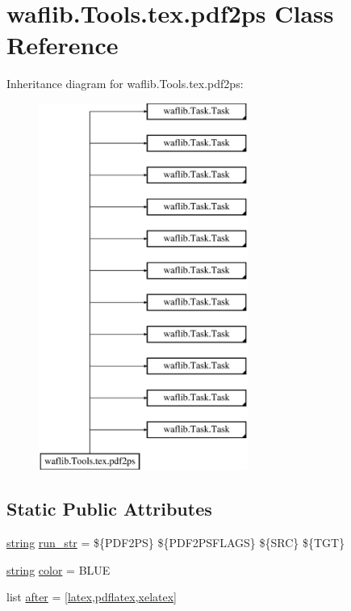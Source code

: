 \hypertarget{classwaflib_1_1_tools_1_1tex_1_1pdf2ps}{}\section{waflib.\+Tools.\+tex.\+pdf2ps Class Reference}
\label{classwaflib_1_1_tools_1_1tex_1_1pdf2ps}
Inheritance diagram for waflib.\+Tools.\+tex.\+pdf2ps\+:\begin{figure}[H]
\begin{center}
\leavevmode
\includegraphics[height=12.000000cm]{classwaflib_1_1_tools_1_1tex_1_1pdf2ps}
\end{center}
\end{figure}
\subsection*{Static Public Attributes}
\begin{DoxyCompactItemize}
\item 
\hyperlink{test__lib_f_l_a_c_2format_8c_ab02026ad0de9fb6c1b4233deb0a00c75}{string} \hyperlink{classwaflib_1_1_tools_1_1tex_1_1pdf2ps_ac4694d84ae08bec5367c7c83c8aa2a33}{run\+\_\+str} = \textquotesingle{}\$\{P\+D\+F2\+PS\} \$\{P\+D\+F2\+P\+S\+F\+L\+A\+GS\} \$\{S\+RC\} \$\{T\+GT\}\textquotesingle{}
\item 
\hyperlink{test__lib_f_l_a_c_2format_8c_ab02026ad0de9fb6c1b4233deb0a00c75}{string} \hyperlink{classwaflib_1_1_tools_1_1tex_1_1pdf2ps_a602d2f88324a231dbd7b7513771fbd48}{color} = \textquotesingle{}B\+L\+UE\textquotesingle{}
\item 
list \hyperlink{classwaflib_1_1_tools_1_1tex_1_1pdf2ps_a106685110317a2fd683231d19dbfa09e}{after} = \mbox{[}\textquotesingle{}\hyperlink{classwaflib_1_1_tools_1_1tex_1_1latex}{latex}\textquotesingle{},\textquotesingle{}\hyperlink{classwaflib_1_1_tools_1_1tex_1_1pdflatex}{pdflatex}\textquotesingle{},\textquotesingle{}\hyperlink{classwaflib_1_1_tools_1_1tex_1_1xelatex}{xelatex}\textquotesingle{}\mbox{]}
\end{DoxyCompactItemize}
